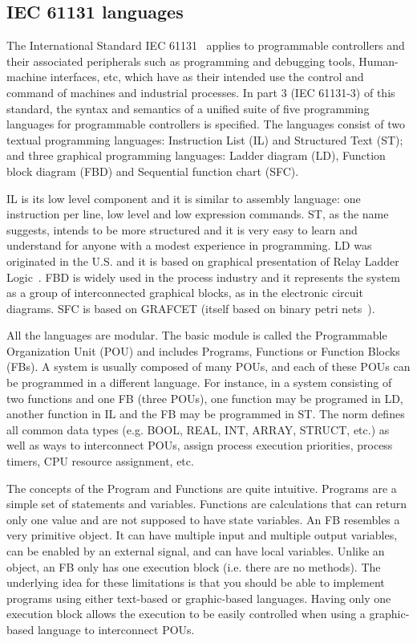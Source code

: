 \documentclass[11pt,twoside]{article}
\begin{document}
\begin{multicols}{2}
\subsection{IEC 61131 languages}
\label{sec:Languages}

The International Standard IEC 61131~\cite{IEC} applies to programmable controllers and their associated peripherals such as programming and debugging tools, Human-machine interfaces, etc, which have as their intended use the control and command of machines and industrial processes. In part 3 (IEC 61131-3) of this standard, the syntax and semantics of a unified suite of five programming languages for programmable controllers is specified. The languages consist of two textual programming languages: Instruction List (IL) and Structured Text (ST); and three graphical programming languages: Ladder diagram (LD), Function block diagram (FBD) and Sequential function chart (SFC).  

IL is its low level component and it is similar to assembly language: one instruction per line, low level and low expression commands. ST, as the name suggests, intends to be more structured and it is very easy to learn and understand for anyone with a modest experience in programming.  LD was originated in the U.S. and it is based on graphical presentation of Relay Ladder Logic~\cite{Kamen1999}. FBD is widely used in the process industry and it represents the system as a group of interconnected graphical blocks, as in the electronic circuit diagrams. SFC is based on GRAFCET (itself based on binary petri nets~\cite{Reisig1991}).

All the languages are modular. The basic module is called the Programmable Organization Unit (POU) and includes Programs, Functions or Function Blocks (FBs). A system is usually composed of many POUs, and each of these POUs can be programmed in a different language. For instance, in a system consisting of two functions and one FB (three POUs), one function may be programed in LD, another function in IL and the FB may be programmed in ST. The norm defines all common data types (e.g. BOOL, REAL, INT, ARRAY, STRUCT, etc.) as well as ways to interconnect POUs, assign process execution priorities, process timers, CPU resource assignment, etc.

The concepts of the Program and Functions are quite intuitive. Programs are a simple set of statements and variables. Functions are calculations that can return only one value and are not supposed to have state variables. An FB resembles a very primitive object.  It can have multiple input and multiple output variables, can be enabled by an external signal, and can have local variables. Unlike an object, an FB only has one execution block (i.e. there are no methods). The underlying idea for these limitations is that you should be able to implement programs using either text-based or graphic-based languages. Having only one execution block allows the execution to be easily controlled when using a graphic-based language to interconnect POUs.


\end{multicols}
\end{document}
